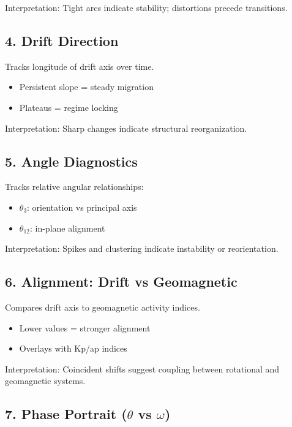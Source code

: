 \documentclass[11pt]{article}
\begin{document}
Interpretation:
Tight arcs indicate stability; distortions precede transitions.

\subsection{4. Drift Direction}

Tracks longitude of drift axis over time.

\begin{itemize}
\item Persistent slope = steady migration
\item Plateaus = regime locking
\end{itemize}

Interpretation:
Sharp changes indicate structural reorganization.

\subsection{5. Angle Diagnostics}

Tracks relative angular relationships:

\begin{itemize}
\item $\theta_3$: orientation vs principal axis
\item $\theta_{12}$: in-plane alignment
\end{itemize}

Interpretation:
Spikes and clustering indicate instability or reorientation.

\subsection{6. Alignment: Drift vs Geomagnetic}

Compares drift axis to geomagnetic activity indices.

\begin{itemize}
\item Lower values = stronger alignment
\item Overlays with Kp/ap indices
\end{itemize}

Interpretation:
Coincident shifts suggest coupling between rotational and geomagnetic systems.

\subsection{7. Phase Portrait ($\theta$ vs $\omega$)}
\end{document}
